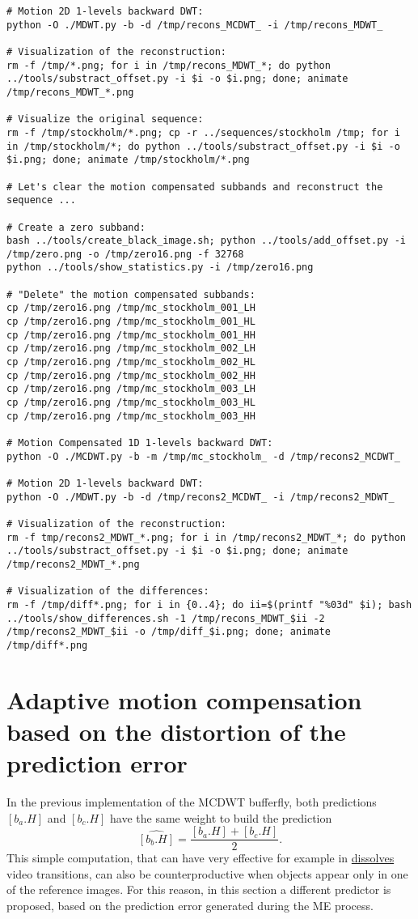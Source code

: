 \begin{verbatim}
# Motion 2D 1-levels backward DWT:
python -O ./MDWT.py -b -d /tmp/recons_MCDWT_ -i /tmp/recons_MDWT_

# Visualization of the reconstruction:
rm -f /tmp/*.png; for i in /tmp/recons_MDWT_*; do python ../tools/substract_offset.py -i $i -o $i.png; done; animate /tmp/recons_MDWT_*.png

# Visualize the original sequence:
rm -f /tmp/stockholm/*.png; cp -r ../sequences/stockholm /tmp; for i in /tmp/stockholm/*; do python ../tools/substract_offset.py -i $i -o $i.png; done; animate /tmp/stockholm/*.png

# Let's clear the motion compensated subbands and reconstruct the sequence ...

# Create a zero subband:
bash ../tools/create_black_image.sh; python ../tools/add_offset.py -i /tmp/zero.png -o /tmp/zero16.png -f 32768
python ../tools/show_statistics.py -i /tmp/zero16.png

# "Delete" the motion compensated subbands:
cp /tmp/zero16.png /tmp/mc_stockholm_001_LH
cp /tmp/zero16.png /tmp/mc_stockholm_001_HL
cp /tmp/zero16.png /tmp/mc_stockholm_001_HH
cp /tmp/zero16.png /tmp/mc_stockholm_002_LH
cp /tmp/zero16.png /tmp/mc_stockholm_002_HL
cp /tmp/zero16.png /tmp/mc_stockholm_002_HH
cp /tmp/zero16.png /tmp/mc_stockholm_003_LH
cp /tmp/zero16.png /tmp/mc_stockholm_003_HL
cp /tmp/zero16.png /tmp/mc_stockholm_003_HH

# Motion Compensated 1D 1-levels backward DWT:
python -O ./MCDWT.py -b -m /tmp/mc_stockholm_ -d /tmp/recons2_MCDWT_

# Motion 2D 1-levels backward DWT:
python -O ./MDWT.py -b -d /tmp/recons2_MCDWT_ -i /tmp/recons2_MDWT_

# Visualization of the reconstruction:
rm -f tmp/recons2_MDWT_*.png; for i in /tmp/recons2_MDWT_*; do python ../tools/substract_offset.py -i $i -o $i.png; done; animate /tmp/recons2_MDWT_*.png

# Visualization of the differences:
rm -f /tmp/diff*.png; for i in {0..4}; do ii=$(printf "%03d" $i); bash ../tools/show_differences.sh -1 /tmp/recons_MDWT_$ii -2 /tmp/recons2_MDWT_$ii -o /tmp/diff_$i.png; done; animate /tmp/diff*.png
\end{verbatim}

\section{Adaptive motion compensation based on the distortion of the prediction error}
In the previous implementation of the MCDWT bufferfly, both
predictions $[b_a.H]$ and $[b_c.H]$ have the same weight to build the
prediction
\begin{equation}
  \hat{[b_b.H]} = \frac{[b_a.H] + [b_c.H]}{2}.
\end{equation}
This simple computation, that can have very effective for example in
\href{https://biteable.com/blog/tips/video-transitions-effects-examples/}{dissolves}
video transitions, can also be counterproductive when objects appear
only in one of the reference images. For this reason, in this section
a different predictor is proposed, based on the prediction error
generated during the ME process.

